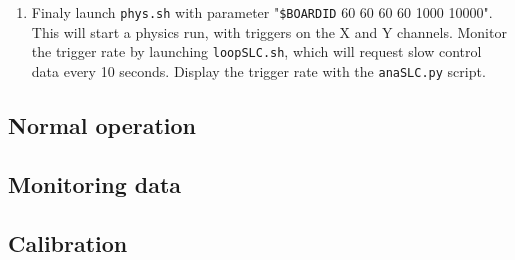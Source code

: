 \begin{enumerate}[-]
%
\item{Finaly launch \texttt{phys.sh} with parameter "\texttt{\$BOARDID} 60 60 60 60 1000 10000". This will start a physics run, with triggers on the X and Y channels. Monitor the trigger rate by launching \texttt{loopSLC.sh}, which will request slow control data every 10 seconds. Display the trigger rate with the \texttt{anaSLC.py} script.}
\end{enumerate} 

\subsection{Normal operation}

\subsection{Monitoring data}

\subsection{Calibration}
